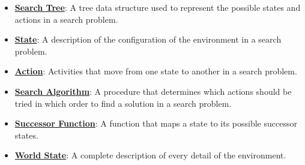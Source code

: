 \documentclass{article}%
\begin{document}
\begin{itemize}[leftmargin=*]
\item \href{https://purdue.brightspace.com/d2l/common/assets/pdfjs-d2l-dist/1.0.14-legacy/web/viewer.html?file=%2Fcontent%2Fenforced%2F1095467-wl.202510.CS.24300.001%2F14L1-DepthFS.pdf%3Fou%3D1095467&lang=en-us&container=d2l-fileviewer-rendered-pdf&fullscreen=d2l-fileviewer-rendered-pdf-dialog&height=667#page=11}{\textbf{Search Tree}}: A tree data structure used to represent the possible states and actions in a search problem.%
\item \href{https://purdue.brightspace.com/d2l/common/assets/pdfjs-d2l-dist/1.0.14-legacy/web/viewer.html?file=%2Fcontent%2Fenforced%2F1095467-wl.202510.CS.24300.001%2F14L1-DepthFS.pdf%3Fou%3D1095467&lang=en-us&container=d2l-fileviewer-rendered-pdf&fullscreen=d2l-fileviewer-rendered-pdf-dialog&height=667#page=14}{\textbf{State}}: A description of the configuration of the environment in a search problem.%
\item \href{https://purdue.brightspace.com/d2l/common/assets/pdfjs-d2l-dist/1.0.14-legacy/web/viewer.html?file=%2Fcontent%2Fenforced%2F1095467-wl.202510.CS.24300.001%2F14L1-DepthFS.pdf%3Fou%3D1095467&lang=en-us&container=d2l-fileviewer-rendered-pdf&fullscreen=d2l-fileviewer-rendered-pdf-dialog&height=667#page=14}{\textbf{Action}}: Activities that move from one state to another in a search problem.%
\item \href{https://purdue.brightspace.com/d2l/common/assets/pdfjs-d2l-dist/1.0.14-legacy/web/viewer.html?file=%2Fcontent%2Fenforced%2F1095467-wl.202510.CS.24300.001%2F14L1-DepthFS.pdf%3Fou%3D1095467&lang=en-us&container=d2l-fileviewer-rendered-pdf&fullscreen=d2l-fileviewer-rendered-pdf-dialog&height=667#page=14}{\textbf{Search Algorithm}}: A procedure that determines which actions should be tried in which order to find a solution in a search problem.%
\item \href{https://purdue.brightspace.com/d2l/common/assets/pdfjs-d2l-dist/1.0.14-legacy/web/viewer.html?file=%2Fcontent%2Fenforced%2F1095467-wl.202510.CS.24300.001%2F14L1-DepthFS.pdf%3Fou%3D1095467&lang=en-us&container=d2l-fileviewer-rendered-pdf&fullscreen=d2l-fileviewer-rendered-pdf-dialog&height=667#page=36}{\textbf{Successor Function}}: A function that maps a state to its possible successor states.%
\item \href{https://purdue.brightspace.com/d2l/common/assets/pdfjs-d2l-dist/1.0.14-legacy/web/viewer.html?file=%2Fcontent%2Fenforced%2F1095467-wl.202510.CS.24300.001%2F14L1-DepthFS.pdf%3Fou%3D1095467&lang=en-us&container=d2l-fileviewer-rendered-pdf&fullscreen=d2l-fileviewer-rendered-pdf-dialog&height=667#page=37}{\textbf{World State}}: A complete description of every detail of the environment.%

\end{itemize}
\end{document}
